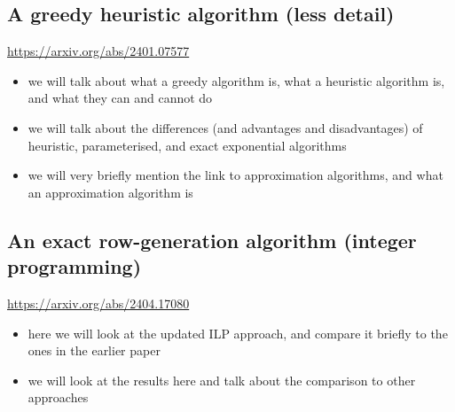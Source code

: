 \documentclass[11pt]{article}
\begin{document}
\subsection{A greedy heuristic algorithm (less detail)}
\url{https://arxiv.org/abs/2401.07577}
\begin{itemize}
    \item we will talk about what a greedy algorithm is, what a heuristic algorithm is, and what they can and cannot do
    \item we will talk about the differences (and advantages and disadvantages) of heuristic, parameterised, and exact exponential algorithms
    \item we will very briefly mention the link to approximation algorithms, and what an approximation algorithm is
\end{itemize}

\subsection{An exact row-generation algorithm (integer programming)}
\url{https://arxiv.org/abs/2404.17080}
\begin{itemize}
    \item here we will look at the updated ILP approach, and compare it briefly to the ones in the earlier paper
    \item we will look at the results here and talk about the comparison to other approaches
\end{itemize}
\end{document}
